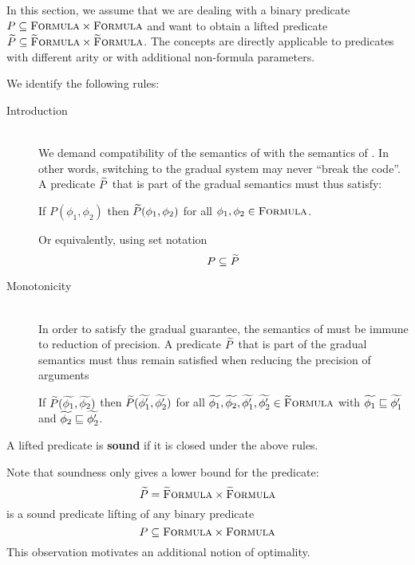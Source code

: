 In this section, we assume that we are dealing with a binary predicate $P \subseteq \textup{\textsc{Formula}} \times \textup{\textsc{Formula}}$ and want to obtain a lifted predicate $\widetilde{P} \subseteq \textup{\textsc{\ensuremath{\widetilde{\text{F}}}ormula}} \times \textup{\textsc{\ensuremath{\widetilde{\text{F}}}ormula}}$.
The concepts are directly applicable to predicates with different arity or with additional non-formula parameters.

We identify the following rules:
\begin{description}
    \item[Introduction]~\\
    We demand compatibility of the semantics of \gvl with the semantics of \svl.
    In other words, switching to the gradual system may never “break the code”.
    A predicate $\widetilde{P}$ that is part of the gradual semantics must thus satisfy:
    
    If $P(\phi_1, \phi_2)$ then $\widetilde{P}(\phi_1, \phi_2)$ for all $\phi_1, \phi_2 \in \textup{\textsc{Formula}}$.
    
    Or equivalently, using set notation
    \begin{displaymath}
    P \subseteq \widetilde{P}
    \end{displaymath}
    
    \item[Monotonicity]~\\
    In order to satisfy the gradual guarantee, the semantics of \gvl must be immune to reduction of precision.
    A predicate $\widetilde{P}$ that is part of the gradual semantics must thus remain satisfied when reducing the precision of arguments
    
    If $\widetilde{P}(\widetilde{\phi_1}, \widetilde{\phi_2})$ then $\widetilde{P}(\widetilde{\phi_1'}, \widetilde{\phi_2'})$ for all $\widetilde{\phi_1}, \widetilde{\phi_2}, \widetilde{\phi_1'}, \widetilde{\phi_2'} \in \textup{\textsc{\ensuremath{\widetilde{\text{F}}}ormula}}$ with $\widetilde{\phi_1} \sqsubseteq \widetilde{\phi_1'}$ and $\widetilde{\phi_2} \sqsubseteq \widetilde{\phi_2'}$.
\end{description}

\begin{definition}
    A lifted predicate is \textbf{sound} if it is closed under the above rules.
\end{definition}

Note that soundness only gives a lower bound for the predicate:
$$\widetilde{P} = \textup{\textsc{\ensuremath{\widetilde{\text{F}}}ormula}} \times \textup{\textsc{\ensuremath{\widetilde{\text{F}}}ormula}}$$ is a sound predicate lifting of any binary predicate $$P \subseteq \textup{\textsc{Formula}} \times \textup{\textsc{Formula}}$$
This observation motivates an additional notion of optimality.

